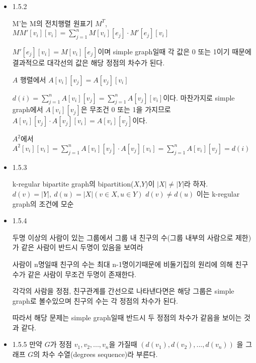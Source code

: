 \documentclass{oblivoir}
\newtheorem{corollary}{Corollary}[theorem]
\begin{document}
\begin{itemize}
    \begin{corollary}
        어떤 그래프의 차수가 홀수인 정점의 갯수는 짝수이다.
    \end{corollary}

    \begin{proof}
        차수가 홀수와 짝수인 $V_1$, $V_2$로 정점을 나누었을 때,
        \[
            \sum_{v \in V_1} d(v) + \sum_{v \in V_2} d(v) = \sum_{v \in V} d(v)
        \]
        는 짝수이다. $\sum_{v \in V_2} d(v)$는 짝수이므로 $\sum_{v \in V_1} d(v)$ 또한 짝수이다. 그러므로 $|V_1|$은 짝수이다.
    \end{proof}

    \item 1.5.2

    M'는 M의 전치행렬 원표기 $M^{T}$,
    $MM'[v_i][v_i] = \sum_{j=1}^n M[v_i][e_j] \cdot M'[e_j][v_i]$

    $ M'[e_j][v_i] = M[v_i][e_j] $이며 simple graph일때 각 값은 0 또는 1이기 때문에 결과적으로 대각선의 값은 해당 정점의 차수가 된다.

    $A$ 행렬에서 $A[v_i][v_j] = A[v_j][v_i]$ 

    $d(i) = \sum_{j=1}^n A[v_i][v_j] = \sum_{j=1}^n A[v_j][v_i]$이다.
    마찬가지로 simple graph에서 $A[v_i][v_j]$은 무조건 0 또는 1을 가지므로 $A[v_i][v_j] \cdot A[v_j][v_i] = A[v_i][v_j]$이다.

    $A^2$에서 $A^2[v_i][v_i] = \sum_{j=1}^n A[v_i][v_j] \cdot A[v_j][v_i]= \sum_{j=1}^n A[v_i][v_j] = d(i)$

    \item 1.5.3
    
    k-regular bipartite graph의 bipartition($X$,$Y$)이 $|X|\neq |Y|$라 하자. $d(v)=|Y|,\: d(u)=|X|(v \in X, u \in Y )$ $d(v) \neq d(u)$ 이는 k-regular graph의 조건에 모순

    \item 1.5.4

    두명 이상의 사람이 있는 그룹에서 그룹 내 친구의 수(그룹 내부의 사람으로 제한)가 같은 사람이 반드시 두명이 있음을 보여라

    사람이 n명일때 친구의 수는 최대 n-1명이기때문에 비둘기집의 원리에 의해 친구 수가 같은 사람이 무조건 두명이 존재한다.

    각각의 사람을 정점, 친구관계를 간선으로 나타낸다면은 해당 그룹은 simple graph로 볼수있으며 친구의 수는 각 정점의 차수가 된다.

    따라서 해당 문제는 simple graph일때 반드시 두 정점의 차수가 같음을 보이는 것과 같다. 

    \item 1.5.5
    만약 $G$가 정점 $v_1, v_2, ... , v_n$을 가질때 $(d(v_1), d(v_2), ... , d(v_n))$ 을 그래프 $G$의 차수 수열(degrees sequence)라 부른다.
    

\end{itemize}
\end{document}
